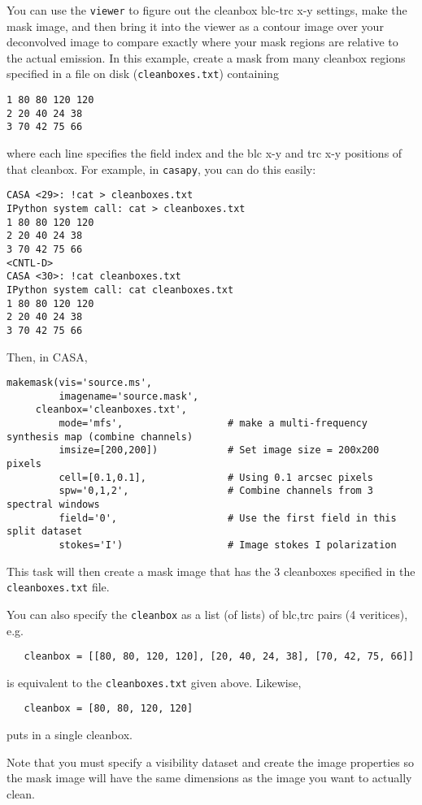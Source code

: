 You can use the {\tt viewer} to figure out the cleanbox blc-trc x-y
settings, make the mask image, and then bring it into the viewer as a
contour image over your deconvolved image to compare exactly where
your mask regions are relative to the actual emission.  In this
example, create a mask from many cleanbox regions specified in a file
on disk ({\tt cleanboxes.txt}) containing
\small
\begin{verbatim}
1 80 80 120 120
2 20 40 24 38
3 70 42 75 66
\end{verbatim}
\normalsize
where each line specifies the field index and the blc x-y and trc x-y
positions of that cleanbox.  For example, in {\tt casapy}, you can do
this easily:
\small
\begin{verbatim}
CASA <29>: !cat > cleanboxes.txt
IPython system call: cat > cleanboxes.txt
1 80 80 120 120
2 20 40 24 38
3 70 42 75 66
<CNTL-D>
CASA <30>: !cat cleanboxes.txt
IPython system call: cat cleanboxes.txt
1 80 80 120 120
2 20 40 24 38
3 70 42 75 66
\end{verbatim}
\normalsize

Then, in CASA,
\small
\begin{verbatim}
makemask(vis='source.ms',
         imagename='source.mask',
	 cleanbox='cleanboxes.txt',
         mode='mfs',                  # make a multi-frequency synthesis map (combine channels)
         imsize=[200,200])            # Set image size = 200x200 pixels
         cell=[0.1,0.1],              # Using 0.1 arcsec pixels
         spw='0,1,2',                 # Combine channels from 3 spectral windows
         field='0',                   # Use the first field in this split dataset
         stokes='I')                  # Image stokes I polarization
\end{verbatim}
\normalsize
This task will then create a mask image that has the 3 cleanboxes
specified in the {\tt cleanboxes.txt} file.  

You can also specify the {\tt cleanbox} as a list (of lists) of
blc,trc pairs (4 veritices), e.g.
\small
\begin{verbatim}
   cleanbox = [[80, 80, 120, 120], [20, 40, 24, 38], [70, 42, 75, 66]]
\end{verbatim}
\normalsize
is equivalent to the {\tt cleanboxes.txt} given above.  Likewise,
\small
\begin{verbatim}
   cleanbox = [80, 80, 120, 120]
\end{verbatim}
\normalsize
puts in a single cleanbox.

Note that you must specify a visibility dataset and create the image
properties so the mask image will have the same dimensions as the
image you want to actually clean.  

